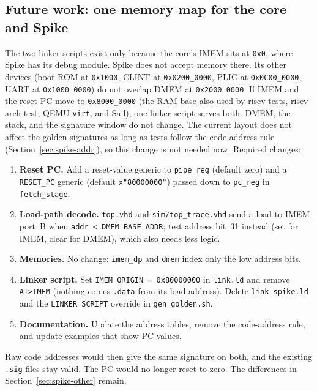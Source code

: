 \subsection{Future work: one memory map for the core and Spike}
\label{sec:future-memmap}
The two linker scripts exist only because the core's IMEM sits at
\texttt{0x0}, where Spike has its debug module. Spike does not accept memory
there. Its other devices (boot ROM at \texttt{0x1000}, CLINT at
\texttt{0x0200\_0000}, PLIC at \texttt{0x0C00\_0000}, UART at
\texttt{0x1000\_0000}) do not overlap DMEM at \texttt{0x2000\_0000}. If IMEM
and the reset PC move to \texttt{0x8000\_0000} (the RAM base also used by
riscv-tests, riscv-arch-test, QEMU \texttt{virt}, and Sail), one linker script
serves both. DMEM, the stack, and the signature window do not change. The
current layout does not affect the golden signatures as long as tests follow
the code-address rule (Section~\ref{sec:spike-addr}), so this change is not
needed now. Required changes:
\begin{enumerate}[leftmargin=*]
  \item \textbf{Reset PC.} Add a reset-value generic to \texttt{pipe\_reg}
  (default zero) and a \texttt{RESET\_PC} generic (default
  \texttt{x"80000000"}) passed down to \texttt{pc\_reg} in
  \texttt{fetch\_stage}.
  \item \textbf{Load-path decode.} \texttt{top.vhd} and
  \texttt{sim/top\_trace.vhd} send a load to IMEM port~B when
  \texttt{addr < DMEM\_BASE\_ADDR}; test address bit~31 instead (set for
  IMEM, clear for DMEM), which also needs less logic.
  \item \textbf{Memories.} No change: \texttt{imem\_dp} and \texttt{dmem} index
  only the low address bits.
  \item \textbf{Linker script.} Set \texttt{IMEM ORIGIN = 0x80000000} in
  \texttt{link.ld} and remove \texttt{AT>IMEM} (nothing copies \texttt{.data}
  from its load address). Delete \texttt{link\_spike.ld} and the
  \texttt{LINKER\_SCRIPT} override in \texttt{gen\_golden.sh}.
  \item \textbf{Documentation.} Update the address tables, remove the
  code-address rule, and update examples that show PC values.
\end{enumerate}
Raw code addresses would then give the same signature on both, and the existing
\texttt{.sig} files stay valid. The PC would no longer reset to zero. The
differences in Section~\ref{sec:spike-other} remain.
